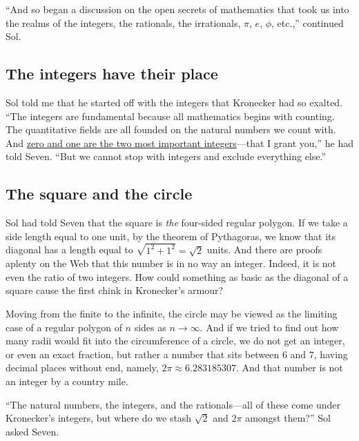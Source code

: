 \documentclass[
  a4paper,
]{article}
\begin{document}
``And so began a discussion on the open secrets of mathematics that took
us into the realms of the integers, the rationals, the irrationals,
\(\pi\), \(e\), \(\phi\), etc.,'' continued Sol.

\hypertarget{the-integers-have-their-place}{%
\subsection{The integers have their
place}\label{the-integers-have-their-place}}

Sol told me that he started off with the integers that Kronecker had so
exalted. ``The integers are fundamental because all mathematics begins
with counting. The quantitative fields are all founded on the natural
numbers we count with. And
\href{https://swanlotus.netlify.app/blogs/the-two-most-important-numbers-zero-and-one}{zero
and one are the two most important integers}---that I grant you,'' he
had told Seven. ``But we cannot stop with integers and exclude
everything else.''

\hypertarget{the-square-and-the-circle}{%
\subsection{The square and the circle}\label{the-square-and-the-circle}}

Sol had told Seven that the square is \emph{the} four-sided regular
polygon. If we take a side length equal to one unit, by the theorem of
Pythagoras, we know that its diagonal has a length equal to
\(\sqrt{1^2 + 1^2} = \sqrt{2}\) units. And there are proofs aplenty on
the Web that this number is in no way an integer. Indeed, it is not even
the ratio of two integers. How could something as basic as the diagonal
of a square cause the first chink in Kronecker's armour?

Moving from the finite to the infinite, the circle may be viewed as the
limiting case of a regular polygon of \(n\) sides as \(n \to \infty\).
And if we tried to find out how many radii would fit into the
circumference of a circle, we do not get an integer, or even an exact
fraction, but rather a number that sits between \(6\) and \(7\), having
decimal places without end, namely, \(2\pi \approx 6.283185307\). And
that number is not an integer by a country mile.

``The natural numbers, the integers, and the rationals---all of these
come under Kronecker's integers, but where do we stash \(\sqrt{2}\) and
\(2\pi\) amongst them?'' Sol asked Seven.
\end{document}
